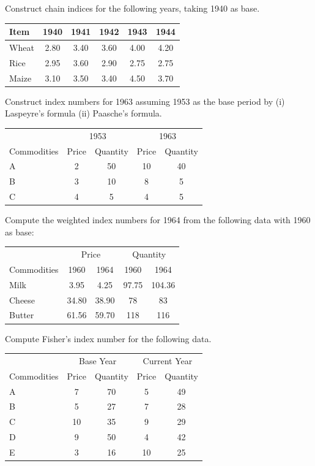 \documentclass[11pt,a4paper]{article}
\begin{document}
\begin{longlist}
\item Construct chain indices for the following years, taking 1940 as base.
\begin{center}
\begin{tabular}{l ccccc}
\toprule
Item & 1940 & 1941 & 1942 & 1943 & 1944 \\
\midrule
Wheat & 2.80 & 3.40 & 3.60 & 4.00 & 4.20 \\
Rice & 2.95 & 3.60 & 2.90 & 2.75 & 2.75 \\
Maize & 3.10 & 3.50 & 3.40 & 4.50 & 3.70 \\
\bottomrule
\end{tabular}
\end{center}

\item Construct index numbers for 1963 assuming 1953 as the base period by (i) Laspeyre's formula (ii) Paasche's formula.
\begin{center}
\begin{tabular}{l cccc}
\toprule
& \multicolumn{2}{c}{1953} & \multicolumn{2}{c}{1963} \\
Commodities & Price & Quantity & Price & Quantity \\
\midrule
A & 2 & 50 & 10 & 40 \\
B & 3 & 10 & 8 & 5 \\
C & 4 & 5 & 4 & 5 \\
\bottomrule
\end{tabular}
\end{center}

\item Compute the weighted index numbers for 1964 from the following data with 1960 as base:
\begin{center}
\begin{tabular}{l cc cc}
\toprule
& \multicolumn{2}{c}{Price} & \multicolumn{2}{c}{Quantity} \\
Commodities & 1960 & 1964 & 1960 & 1964 \\
\midrule
Milk & 3.95 & 4.25 & 97.75 & 104.36 \\
Cheese & 34.80 & 38.90 & 78 & 83 \\
Butter & 61.56 & 59.70 & 118 & 116 \\
\bottomrule
\end{tabular}
\end{center}

\item Compute Fisher's index number for the following data.
\begin{center}
\begin{tabular}{l cccc}
\toprule
& \multicolumn{2}{c}{Base Year} & \multicolumn{2}{c}{Current Year} \\
Commodities & Price & Quantity & Price & Quantity \\
\midrule
A & 7 & 70 & 5 & 49 \\
B & 5 & 27 & 7 & 28 \\
C & 10 & 35 & 9 & 29 \\
D & 9 & 50 & 4 & 42 \\
E & 3 & 16 & 10 & 25 \\
\bottomrule
\end{tabular}
\end{center}


\end{longlist}
\end{document}

